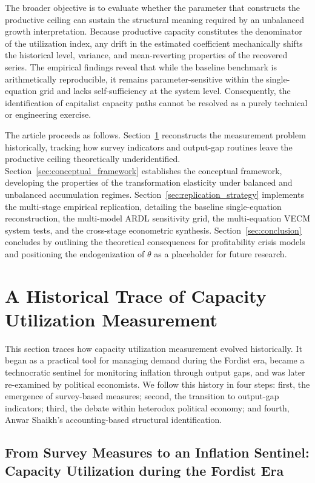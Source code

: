 \documentclass[11pt]{article}
\begin{document}
The broader objective is to evaluate whether the parameter that constructs the productive ceiling can sustain the structural meaning required by an unbalanced growth interpretation. Because productive capacity constitutes the denominator of the utilization index, any drift in the estimated coefficient mechanically shifts the historical level, variance, and mean-reverting properties of the recovered series. The empirical findings reveal that while the baseline benchmark is arithmetically reproducible, it remains parameter-sensitive within the single-equation grid and lacks self-sufficiency at the system level. Consequently, the identification of capitalist capacity paths cannot be resolved as a purely technical or engineering exercise.

The article proceeds as follows. Section~\ref{sec:literature_review} reconstructs the measurement problem historically, tracking how survey indicators and output-gap routines leave the productive ceiling theoretically underidentified. Section~\ref{sec:conceptual_framework} establishes the conceptual framework, developing the properties of the transformation elasticity under balanced and unbalanced accumulation regimes. Section~\ref{sec:replication_strategy} implements the multi-stage empirical replication, detailing the baseline single-equation reconstruction, the multi-model ARDL sensitivity grid, the multi-equation VECM system tests, and the cross-stage econometric synthesis. Section~\ref{sec:conclusion} concludes by outlining the theoretical consequences for profitability crisis models and positioning the endogenization of $\theta$ as a placeholder for future research.

\section{A Historical Trace of Capacity Utilization Measurement}
\label{sec:literature_review}

This section traces how capacity utilization measurement evolved historically. It began as a practical tool for managing demand during the Fordist era, became a technocratic sentinel for monitoring inflation through output gaps, and was later re-examined by political economists. We follow this history in four steps: first, the emergence of survey-based measures; second, the transition to output-gap indicators; third, the debate within heterodox political economy; and fourth, Anwar Shaikh's accounting-based structural identification.

\subsection{From Survey Measures to an Inflation Sentinel: Capacity Utilization during the Fordist Era}
\label{subsec:fordist_survey_statecraft}
\end{document}
